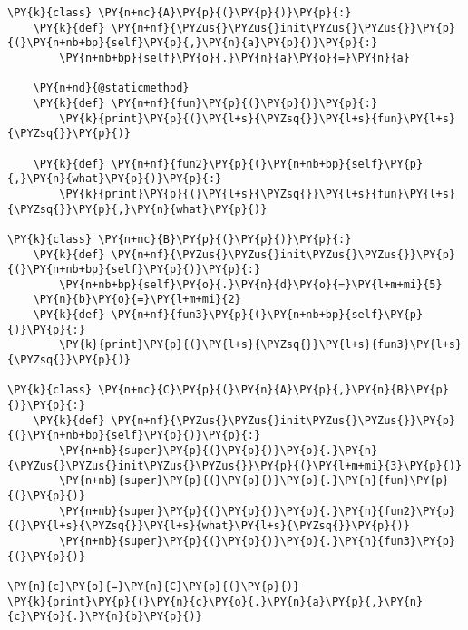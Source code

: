 \begin{Verbatim}[commandchars=\\\{\}]
\PY{k}{class} \PY{n+nc}{A}\PY{p}{(}\PY{p}{)}\PY{p}{:}
    \PY{k}{def} \PY{n+nf}{\PYZus{}\PYZus{}init\PYZus{}\PYZus{}}\PY{p}{(}\PY{n+nb+bp}{self}\PY{p}{,}\PY{n}{a}\PY{p}{)}\PY{p}{:}
        \PY{n+nb+bp}{self}\PY{o}{.}\PY{n}{a}\PY{o}{=}\PY{n}{a}

    \PY{n+nd}{@staticmethod}
    \PY{k}{def} \PY{n+nf}{fun}\PY{p}{(}\PY{p}{)}\PY{p}{:}
        \PY{k}{print}\PY{p}{(}\PY{l+s}{\PYZsq{}}\PY{l+s}{fun}\PY{l+s}{\PYZsq{}}\PY{p}{)}

    \PY{k}{def} \PY{n+nf}{fun2}\PY{p}{(}\PY{n+nb+bp}{self}\PY{p}{,}\PY{n}{what}\PY{p}{)}\PY{p}{:}
        \PY{k}{print}\PY{p}{(}\PY{l+s}{\PYZsq{}}\PY{l+s}{fun}\PY{l+s}{\PYZsq{}}\PY{p}{,}\PY{n}{what}\PY{p}{)}

\PY{k}{class} \PY{n+nc}{B}\PY{p}{(}\PY{p}{)}\PY{p}{:}
    \PY{k}{def} \PY{n+nf}{\PYZus{}\PYZus{}init\PYZus{}\PYZus{}}\PY{p}{(}\PY{n+nb+bp}{self}\PY{p}{)}\PY{p}{:}
        \PY{n+nb+bp}{self}\PY{o}{.}\PY{n}{d}\PY{o}{=}\PY{l+m+mi}{5}
    \PY{n}{b}\PY{o}{=}\PY{l+m+mi}{2}
    \PY{k}{def} \PY{n+nf}{fun3}\PY{p}{(}\PY{n+nb+bp}{self}\PY{p}{)}\PY{p}{:}
        \PY{k}{print}\PY{p}{(}\PY{l+s}{\PYZsq{}}\PY{l+s}{fun3}\PY{l+s}{\PYZsq{}}\PY{p}{)}

\PY{k}{class} \PY{n+nc}{C}\PY{p}{(}\PY{n}{A}\PY{p}{,}\PY{n}{B}\PY{p}{)}\PY{p}{:}
    \PY{k}{def} \PY{n+nf}{\PYZus{}\PYZus{}init\PYZus{}\PYZus{}}\PY{p}{(}\PY{n+nb+bp}{self}\PY{p}{)}\PY{p}{:}
        \PY{n+nb}{super}\PY{p}{(}\PY{p}{)}\PY{o}{.}\PY{n}{\PYZus{}\PYZus{}init\PYZus{}\PYZus{}}\PY{p}{(}\PY{l+m+mi}{3}\PY{p}{)}
        \PY{n+nb}{super}\PY{p}{(}\PY{p}{)}\PY{o}{.}\PY{n}{fun}\PY{p}{(}\PY{p}{)}
        \PY{n+nb}{super}\PY{p}{(}\PY{p}{)}\PY{o}{.}\PY{n}{fun2}\PY{p}{(}\PY{l+s}{\PYZsq{}}\PY{l+s}{what}\PY{l+s}{\PYZsq{}}\PY{p}{)}
        \PY{n+nb}{super}\PY{p}{(}\PY{p}{)}\PY{o}{.}\PY{n}{fun3}\PY{p}{(}\PY{p}{)}

\PY{n}{c}\PY{o}{=}\PY{n}{C}\PY{p}{(}\PY{p}{)}
\PY{k}{print}\PY{p}{(}\PY{n}{c}\PY{o}{.}\PY{n}{a}\PY{p}{,}\PY{n}{c}\PY{o}{.}\PY{n}{b}\PY{p}{)}
\end{Verbatim}
